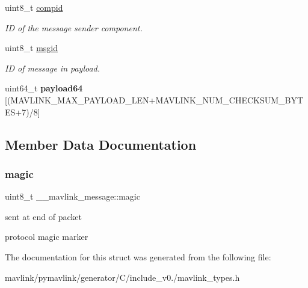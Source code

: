 \begin{DoxyCompactItemize}
\mbox{\label{struct____mavlink__message_a83ed773c359ffe4a8d0746f82af2b44d}} 
uint8\+\_\+t \hyperlink{struct____mavlink__message_a83ed773c359ffe4a8d0746f82af2b44d}{compid}
\begin{DoxyCompactList}\small\item\em ID of the message sender component. \end{DoxyCompactList}\item 
\mbox{\label{struct____mavlink__message_a8d95b61c61b9086bada158104828d593}} 
uint8\+\_\+t \hyperlink{struct____mavlink__message_a8d95b61c61b9086bada158104828d593}{msgid}
\begin{DoxyCompactList}\small\item\em ID of message in payload. \end{DoxyCompactList}\item 
\mbox{\label{struct____mavlink__message_a267401209e74271b7ded879bb0f44e73}} 
uint64\+\_\+t {\bfseries payload64} \mbox{[}(M\+A\+V\+L\+I\+N\+K\+\_\+\+M\+A\+X\+\_\+\+P\+A\+Y\+L\+O\+A\+D\+\_\+\+L\+EN+M\+A\+V\+L\+I\+N\+K\+\_\+\+N\+U\+M\+\_\+\+C\+H\+E\+C\+K\+S\+U\+M\+\_\+\+B\+Y\+T\+ES+7)/8\mbox{]}
\end{DoxyCompactItemize}


\subsection{Member Data Documentation}
\mbox{\label{struct____mavlink__message_a2e6ee9d46821aea33a08231dea000355}} 
\subsubsection{\texorpdfstring{magic}{magic}}
{\footnotesize\ttfamily uint8\+\_\+t \+\_\+\+\_\+mavlink\+\_\+message\+::magic}



sent at end of packet 

protocol magic marker 

The documentation for this struct was generated from the following file\+:\begin{DoxyCompactItemize}
\item 
mavlink/pymavlink/generator/\+C/include\+\_\+v0./mavlink\+\_\+types.\+h\end{DoxyCompactItemize}
